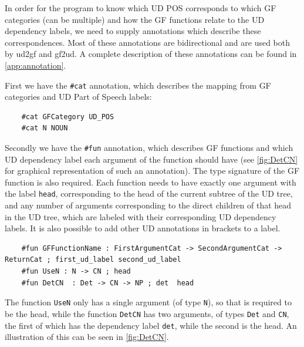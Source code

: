 In order for the program to know which \ac{UD} \ac{POS} corresponds to which \ac{GF} categories (can be multiple) and how the \ac{GF} functions relate to the \ac{UD} dependency labels, we need to supply annotations which describe these correspondences. Most of these annotations are bidirectional and are used both by ud2gf and gf2ud. A complete description of these annotations can be found in \autoref{app:annotation}.

First we have the \lstinline{#cat} annotation, which describes the mapping from \ac{GF} categories and \ac{UD} Part of Speech labels:

\begin{lstlisting}
    #cat GFCategory UD_POS
    #cat N NOUN
\end{lstlisting}

Secondly we have the \lstinline{#fun} annotation, which describes \ac{GF} functions and which \ac{UD} dependency label each argument of the function should have (see \autoref{fig:DetCN} for graphical representation of such an annotation). The type signature of the \ac{GF} function is also required. Each function needs to have exactly one argument with the label \lstinline{head}, corresponding to the head of the current subtree of the \ac{UD} tree, and any number of arguments corresponding to the direct children of that head in the \ac{UD} tree, which are labeled with their corresponding \ac{UD} dependency labels. It is also possible to add other \ac{UD} annotations in brackets to a label.

\begin{lstlisting}
    #fun GFFunctionName : FirstArgumentCat -> SecondArgumentCat -> ReturnCat ; first_ud_label second_ud_label
    #fun UseN : N -> CN ; head
    #fun DetCN  : Det -> CN -> NP ; det  head
\end{lstlisting}

The function \lstinline{UseN} only has a single argument (of type \lstinline{N}), so that is required to be the head, while the function \verb|DetCN| has two arguments, of types \verb|Det| and \verb|CN|, the first of which has the dependency label \verb|det|, while the second is the head. An illustration of this can be seen in \autoref{fig:DetCN}.

